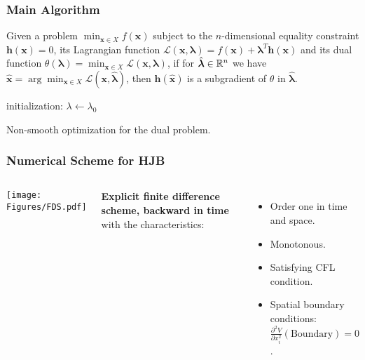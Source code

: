 \begin{frame}
\frametitle{Main Algorithm}
\begin{theorem} \label{theo_subgradient}
Given a problem $\min_{\bm{x}\in X}f(\bm{x})$ subject to the $n$-dimensional equality constraint $\bm{h}(\bm{x})=0$, its Lagrangian function $\mathcal{L}(\bm{x},\bm{\lambda})=f(\bm{x})+\bm{\lambda}^T\bm{h}(\bm{x})$ and its dual function $\theta(\bm{\lambda})=\min_{\bm{x}\in X}\mathcal{L}(\bm{x},\bm{\lambda})$, if for $\hat{\bm{\lambda}}\in\mathbb{R}^n$ we have $\hat{\bm{x}}=\arg\min_{\bm{x}\in X}\mathcal{L}(\bm{x},\hat{\bm{\lambda}})$, then $\bm{h}(\hat{\bm{x}})$ is a subgradient of $\theta$ in $\hat{\bm{\lambda}}$.
\end{theorem}

\begin{center}
\begin{minipage}{0.9\textwidth}
\begin{algorithm}[H]
\SetAlgoLined
 initialization: $\lambda\leftarrow\lambda_0$\;
 \caption{Non-smooth optimization for the dual problem.}
\end{algorithm}
\end{minipage}
\end{center}

\end{frame}


\begin{frame}
\frametitle{Numerical Scheme for HJB}

\begin{columns}[c] %

\centering
\texttt{[image: Figures/FDS.pdf]}

\textbf{Explicit finite difference scheme, backward in time} with the characteristics:\\
\begin{itemize}
\item Order one in time and space.
\item Monotonous.
\item Satisfying CFL condition.
\item Spatial boundary conditions: $\frac{\partial^2 V}{\partial x_i^2}(\text{Boundary})=0$.
\end{itemize}

\end{columns}

\end{frame}

